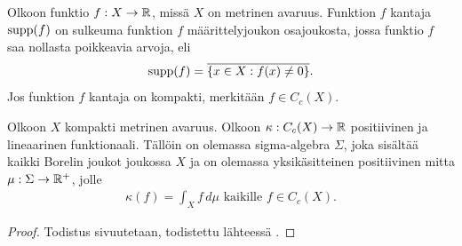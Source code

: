 \documentclass[12pt,oneside,a4paper]{amsbook} %
\begin{document}
\begin{definition}
    Olkoon funktio $f:X \to \mathbb{R}$, missä $X$ on metrinen avaruus. Funktion $f$ kantaja $\operatorname{supp}(f)$ on sulkeuma funktion $f$ määrittelyjoukon osajoukosta, jossa funktio $f$ saa nollasta poikkeavia arvoja, eli
    \begin{equation*}
        \operatorname{supp}(f) = \overline{\{x \in X : f(x) \ne 0\}}.
    \end{equation*}
     Jos funktion $f$ kantaja on kompakti, merkitään $f \in C_c(X)$.
\end{definition}


\begin{theorem}\label{thm:Riesz}
    Olkoon $X$ kompakti metrinen avaruus. Olkoon $\kappa:C_c(X) \to \mathbb{R}$ positiivinen ja lineaarinen funktionaali. Tällöin on olemassa sigma-algebra $\Sigma$, joka sisältää kaikki Borelin joukot joukossa $X$ ja on olemassa yksikäsitteinen positiivinen mitta $\mu:\Sigma \to {\mathbb{R}^{+}}$, jolle
    \begin{align*}
        \kappa (f) = \int_X f \, d\mu \text{ kaikille } f \in C_c(X).
    \end{align*}
\end{theorem}
\begin{proof}
    Todistus sivuutetaan, todistettu lähteessä \cite[s. 40]{rudin}.
\end{proof}
\end{document}
